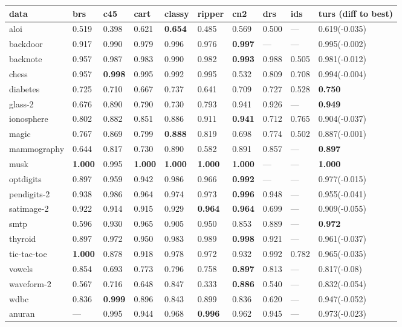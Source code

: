 \begin{table}[ht]
\small
\centering
\begin{tabular}{l|llllllll|l}
  \hline
data & brs & c45 & cart & classy & ripper & cn2 & drs & ids & turs \tiny{(diff to best)} \\ 
  \hline
aloi & 0.519 & 0.398 & 0.621 & \textbf{0.654} & 0.485 & 0.569 & 0.500 & --- & 0.619\tiny{(-0.035)} \\ 
  backdoor & 0.917 & 0.990 & 0.979 & 0.996 & 0.976 & \textbf{0.997} & --- & --- & 0.995\tiny{(-0.002)} \\ 
  backnote & 0.957 & 0.987 & 0.983 & 0.990 & 0.982 & \textbf{0.993} & 0.988 & 0.505 & 0.981\tiny{(-0.012)} \\ 
  chess & 0.957 & \textbf{0.998} & 0.995 & 0.992 & 0.995 & 0.532 & 0.809 & 0.708 & 0.994\tiny{(-0.004)} \\ 
  diabetes & 0.725 & 0.710 & 0.667 & 0.737 & 0.641 & 0.709 & 0.727 & 0.528 & \textbf{0.750} \\ 
  glass-2 & 0.676 & 0.890 & 0.790 & 0.730 & 0.793 & 0.941 & 0.926 & --- & \textbf{0.949} \\ 
  ionosphere & 0.802 & 0.882 & 0.851 & 0.886 & 0.911 & \textbf{0.941} & 0.712 & 0.765 & 0.904\tiny{(-0.037)} \\ 
  magic & 0.767 & 0.869 & 0.799 & \textbf{0.888} & 0.819 & 0.698 & 0.774 & 0.502 & 0.887\tiny{(-0.001)} \\ 
  mammography & 0.644 & 0.817 & 0.730 & 0.890 & 0.582 & 0.891 & 0.857 & --- & \textbf{0.897} \\ 
  musk & \textbf{1.000} & 0.995 & \textbf{1.000} & \textbf{1.000} & \textbf{1.000} & \textbf{1.000} & --- & --- & \textbf{1.000} \\ 
  optdigits & 0.897 & 0.959 & 0.942 & 0.986 & 0.966 & \textbf{0.992} & --- & --- & 0.977\tiny{(-0.015)} \\ 
  pendigits-2 & 0.938 & 0.986 & 0.964 & 0.974 & 0.973 & \textbf{0.996} & 0.948 & --- & 0.955\tiny{(-0.041)} \\ 
  satimage-2 & 0.922 & 0.914 & 0.915 & 0.929 & \textbf{0.964} & \textbf{0.964} & 0.699 & --- & 0.909\tiny{(-0.055)} \\ 
  smtp & 0.596 & 0.930 & 0.965 & 0.905 & 0.950 & 0.853 & 0.889 & --- & \textbf{0.972} \\ 
  thyroid & 0.897 & 0.972 & 0.950 & 0.983 & 0.989 & \textbf{0.998} & 0.921 & --- & 0.961\tiny{(-0.037)} \\ 
  tic-tac-toe & \textbf{1.000} & 0.878 & 0.918 & 0.978 & 0.972 & 0.932 & 0.992 & 0.782 & 0.965\tiny{(-0.035)} \\ 
  vowels & 0.854 & 0.693 & 0.773 & 0.796 & 0.758 & \textbf{0.897} & 0.813 & --- & 0.817\tiny{(-0.08)} \\ 
  waveform-2 & 0.567 & 0.716 & 0.648 & 0.847 & 0.333 & \textbf{0.886} & 0.540 & --- & 0.832\tiny{(-0.054)} \\ 
  wdbc & 0.836 & \textbf{0.999} & 0.896 & 0.843 & 0.899 & 0.836 & 0.620 & --- & 0.947\tiny{(-0.052)} \\ 
  anuran & --- & 0.995 & 0.944 & 0.968 & \textbf{0.996} & 0.962 & 0.945 & --- & 0.973\tiny{(-0.023)} \\ 
  \hline
  

\end{tabular}
\end{table}
